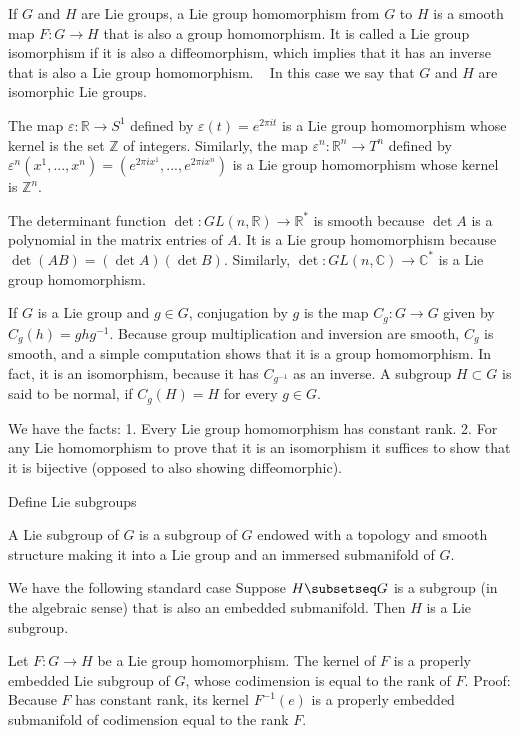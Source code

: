 If \(G\) and \(H\) are Lie groups, a Lie group homomorphism from \(G\) to \(H\) is a smooth map \(F: G \to H\) that is also a group homomorphism. 
It is called a Lie group isomorphism if it is also a diffeomorphism, which implies that it has an inverse that is also a Lie group homomorphism.   
In this case we say that \(G\) and \(H\) are isomorphic Lie groups.

The map \(\varepsilon: \mathbb{R} \to S^1\) defined by \(\varepsilon(t) = e^{2\pi i t}\) is a Lie group homomorphism whose kernel is the set \(\mathbb{Z}\) of integers. 
Similarly, the map \(\varepsilon^n: \mathbb{R}^n \to T^n\) defined by \(\varepsilon^n (x^1, ..., x^n) = (e^{2\pi i x^1}, ..., e^{2\pi i x^n})\) 
is a Lie group homomorphism whose kernel is \(\mathbb{Z}^n\).

The determinant function \(\det: GL(n, \mathbb{R}) \to \mathbb{R}^*\) is smooth because \(\det A\) is a polynomial in the matrix entries of \(A\). It is a Lie group homomorphism because \(\det(AB) = (\det A) (\det B)\). Similarly, \(\det: GL(n, \mathbb{C}) \to \mathbb{C}^*\) is a Lie group homomorphism.

If \(G\) is a Lie group and \(g \in G\), conjugation by \(g\) is the map \(C_g: G \to G\) given by \(C_g (h) = ghg^{-1}\). 
Because group multiplication and inversion are smooth, \(C_g\) is smooth, and a simple computation shows that it is a group homomorphism. 
In fact, it is an isomorphism, because it has \(C_{g^{-1}}\) as an inverse. 
A subgroup \(H \subset G\) is said to be normal, if \(C_g(H) = H\) for every \(g \in G\). 

We have the facts: 
1. Every Lie group homomorphism has constant rank.
2. For any Lie homomorphism to prove that it is an isomorphism it suffices
to show that it is bijective (opposed to also showing diffeomorphic).

Define Lie subgroups

A Lie subgroup of \( G \) is a subgroup of \( G \) endowed with a topology and smooth structure 
making it into a Lie group and an immersed submanifold of \( G \).

We have the following standard case
Suppose \( H \subsetseq G \) is a subgroup (in the algebraic sense) 
that is also an embedded submanifold. Then \( H \) is a Lie subgroup.

Let \( F : G \to H \) be a Lie group homomorphism. The kernel of \( F \)
is a properly embedded Lie subgroup of \( G \), whose codimension is equal to the rank
of \( F \).
Proof:
Because \( F \) has constant rank, its kernel \( F^{-1}(e) \) is a properly embedded
submanifold of codimension equal to the rank \( F \).

